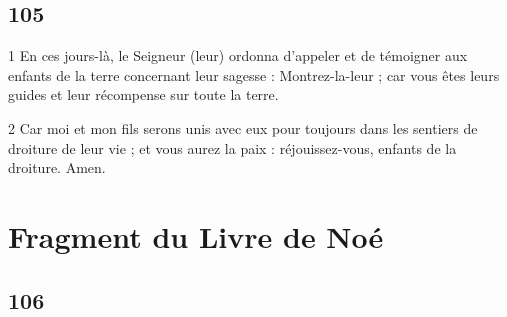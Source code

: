 \chapter{105}

\par 1 En ces jours-là, le Seigneur (leur) ordonna d'appeler et de témoigner aux enfants de la terre concernant leur sagesse : Montrez-la-leur ; car vous êtes leurs guides et leur récompense sur toute la terre.
\par 2 Car moi et mon fils serons unis avec eux pour toujours dans les sentiers de droiture de leur vie ; et vous aurez la paix : réjouissez-vous, enfants de la droiture. Amen.

\part{Fragment du Livre de Noé}

\chapter{106}

